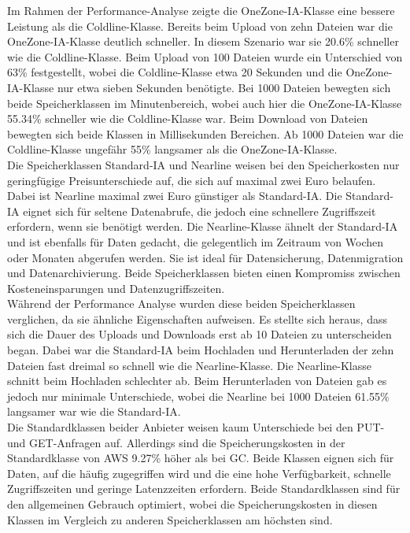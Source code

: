 Im Rahmen der Performance-Analyse zeigte die OneZone-IA-Klasse eine bessere Leistung als die Coldline-Klasse. Bereits beim Upload von zehn Dateien war die OneZone-IA-Klasse deutlich schneller. In diesem Szenario war sie 20.6\% schneller wie die Coldline-Klasse. Beim Upload von 100 Dateien wurde ein Unterschied von 63\% festgestellt, wobei die Coldline-Klasse etwa 20 Sekunden und die OneZone-IA-Klasse nur etwa sieben Sekunden benötigte. Bei 1000 Dateien bewegten sich beide Speicherklassen im Minutenbereich, wobei auch hier die OneZone-IA-Klasse 55.34\% schneller wie die Coldline-Klasse war. Beim Download von Dateien bewegten sich beide Klassen in Millisekunden Bereichen. Ab 1000 Dateien war die Coldline-Klasse ungefähr 55\% langsamer als die OneZone-IA-Klasse.\\

Die Speicherklassen Standard-IA und Nearline weisen bei den Speicherkosten nur geringfügige Preisunterschiede  auf, die sich auf maximal zwei Euro belaufen. Dabei ist Nearline maximal zwei Euro günstiger als Standard-IA. Die Standard-IA eignet sich für seltene Datenabrufe, die jedoch eine schnellere Zugriffszeit erfordern, wenn sie benötigt werden. Die Nearline-Klasse ähnelt der Standard-IA und ist ebenfalls für Daten gedacht, die gelegentlich im Zeitraum von Wochen oder Monaten abgerufen werden. Sie ist ideal für Datensicherung, Datenmigration und Datenarchivierung. Beide Speicherklassen bieten einen Kompromiss zwischen Kosteneinsparungen und Datenzugriffszeiten.\\

Während der Performance Analyse wurden diese beiden Speicherklassen verglichen, da sie ähnliche Eigenschaften aufweisen. Es stellte sich heraus, dass sich die Dauer des Uploads und Downloads erst ab 10 Dateien zu unterscheiden began. Dabei war die Standard-IA beim Hochladen und Herunterladen der zehn Dateien fast dreimal so schnell wie die Nearline-Klasse. Die Nearline-Klasse schnitt beim Hochladen schlechter ab. Beim Herunterladen von Dateien gab es jedoch nur minimale Unterschiede, wobei die Nearline bei 1000 Dateien 61.55\% langsamer war wie die Standard-IA.\\

Die Standardklassen beider Anbieter weisen kaum Unterschiede bei den PUT- und GET-Anfragen auf. Allerdings sind die Speicherungskosten in der Standardklasse von AWS 9.27\% höher als bei GC. Beide Klassen eignen sich für Daten, auf die häufig zugegriffen wird und die eine hohe Verfügbarkeit, schnelle Zugriffszeiten und geringe Latenzzeiten erfordern. Beide Standardklassen sind für den allgemeinen Gebrauch optimiert, wobei die Speicherungskosten in diesen Klassen im Vergleich zu anderen Speicherklassen am höchsten sind.\\

